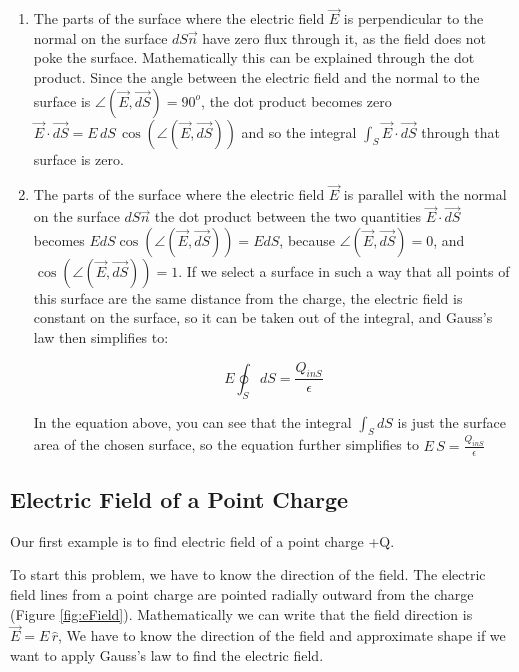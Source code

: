\documentclass{ximera}
\begin{document}
\begin{enumerate}
\item  The parts of the surface where the electric field $\vec{E}$ is perpendicular to the normal on the surface $dS\vec{n}$ have zero flux through it, as the field does not poke the surface. Mathematically this can be explained through the dot product. Since the angle between the electric field and the normal to the surface is $\angle(\vec{E},\vec{dS})=90^o $, the dot product becomes zero $\vec{E} \cdot \vec{dS}= E \, dS \, \cos(\angle(\vec{E},\vec{dS}))$ and so the integral $\int_S \vec{E} \cdot \vec{dS}$ through that surface is zero. 
\item The parts of the surface where the electric field $\vec{E}$ is parallel with the normal on the surface $dS\vec{n}$ the dot product between the two quantities $\vec{E} \cdot \vec{dS}$ becomes $E dS  \cos(\angle(\vec{E},\vec{dS}))= E dS$, because $\angle(\vec{E},\vec{dS})=0$, and $\cos(\angle(\vec{E},\vec{dS}))=1$. If we select a surface in such a way that all points of this surface are the same distance from the charge, the electric field is constant on the surface, so it can be taken out of the integral, and Gauss's law then simplifies to:

\begin{equation}
 {E} \oint_S dS = \frac{Q_{inS}}{\epsilon}
\end{equation}

In the equation above, you can see that the integral $\int_S dS$ is just the surface area of the chosen surface, so the equation further simplifies to $E\,S=\frac{Q_{inS}}{\epsilon}$ 



\end{enumerate}
 
 
 
\subsection{Electric Field of a Point Charge}

Our first example is to find electric field of a point charge +Q. 

To start this problem, we have to know the direction of the field. The electric field lines from a point charge are pointed radially outward from the charge (Figure \ref{fig:eField}). Mathematically we can write that the field direction is $\vec{E}  = E \, \hat{r} $,   We have to know the direction of the field and approximate shape if we want to apply Gauss's law to find the electric field.
\end{document}
